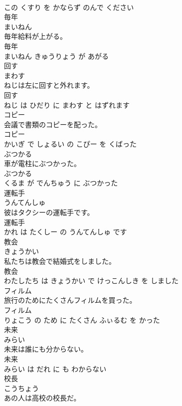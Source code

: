 \documentclass[8pt]{extreport}
\begin{document}
\begin{CJK}{UTF8}{min}
\\	この くすり を かならず のんで ください			
\\	毎年	
\\	まいねん			
\\	毎年給料が上がる。	
\\	毎年 
\\	まいねん きゅうりょう が あがる			
\\	回す	
\\	まわす			
\\	ねじは左に回すと外れます。	
\\	回す 
\\	ねじ は ひだり に まわす と はずれます			
\\	コピー	
\\	会議で書類のコピーを配った。	
\\	コピー 
\\	かいぎ で しょるい の こぴー を くばった			
\\	ぶつかる	
\\	車が電柱にぶつかった。	
\\	ぶつかる 
\\	くるま が でんちゅう に ぶつかった			
\\	運転手	
\\	うんてんしゅ			
\\	彼はタクシーの運転手です。	
\\	運転手 
\\	かれ は たくしー の うんてんしゅ です			
\\	教会	
\\	きょうかい			
\\	私たちは教会で結婚式をしました。	
\\	教会 
\\	わたしたち は きょうかい で けっこんしき を しました			
\\	フィルム	
\\	旅行のためにたくさんフィルムを買った。	
\\	フィルム 
\\	りょこう の ため に たくさん ふぃるむ を かった			
\\	未来	
\\	みらい			
\\	未来は誰にも分からない。	
\\	未来 
\\	みらい は だれ に も わからない			
\\	校長	
\\	こうちょう			
\\	あの人は高校の校長だ。	

\end{CJK}
\end{document}
